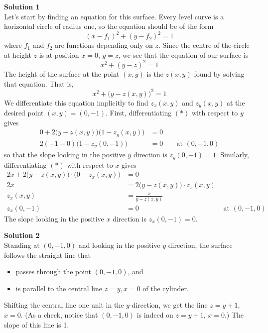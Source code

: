\begin{solution}
\textbf{Solution 1}\\
Let's start by finding an equation for this surface. Every level curve 
is a horizontal circle of radius one, so the equation should be of the form
\begin{equation*}
(x-f_1)^2+(y-f_2)^2=1
\end{equation*}
where $f_1$ and $f_2$ are functions depending only on $z$. Since the centre of the circle at height $z$ is at position $x=0$, $y=z$, we see that the equation of our surface is
\begin{equation*}
x^2+(y-z)^2=1
\end{equation*}
The height of the surface at the point $(x,y)$ is the $z(x,y)$ found by solving
that equation. That is, 
\begin{equation*}
x^2+\big(y-z(x,y)\big)^2=1
\tag{$*$}
\end{equation*}
We differentiate this equation implicitly to find $z_x(x,y)$ and $z_y(x,y)$ at the desired point $(x,y)= (0,-1)$. First, differentiating $(*)$ with respect 
to $y$ gives
\begin{align*}
0+2\big(y-z(x,y)\big)\big(1- z_y(x,y)\big)&=0 \\
2(-1-0)\big(1-z_y(0,-1)\big)&=0& & \mbox{ at } (0,-1,0)
\end{align*}
so that the slope looking in the positive $y$ direction is $z_y(0,-1)=1$.
Similarly, differentiating $(*)$ with respect to $x$ gives
\begin{align*}
2x+2\big(y-z(x,y)\big)\cdot\big(0-z_x(x,y)\big)&=0 \\
2x&=2\big(y-z(x,y)\big)\cdot z_x(x,y)\\
z_x(x,y)&=\frac{x}{y-z(x,y)}\\
z_x(0,-1)&=0 &\mbox{ at } (0,-1,0)
\end{align*}
The slope looking in the positive $x$ direction is $z_x(0,-1)=0$.

\textbf{Solution 2}\\
Standing at $(0,-1,0)$ and looking in the positive $y$ direction, 
the surface follows the straight line that 
\begin{itemize}
\item 
passes through the point $(0,-1,0)$, and  
\item
is parallel to the central line $z=y, x=0$ of the cylinder.
\end{itemize}
Shifting the central line one unit in the $y$-direction, we get the line $z=y+1$, $x=0$. (As a check, notice that $(0,-1,0)$ is indeed on $z=y+1$,  
$x=0$.) The slope of this line is 1.


\end{solution}

